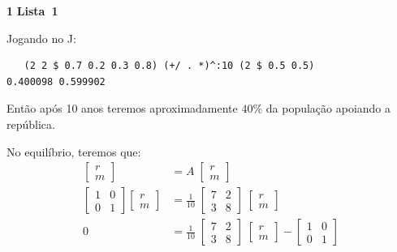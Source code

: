 \documentclass{article}
\newcounter{exe-list}
\newenvironment{exe-list}
    {\begin{list}{(\alph{exe-list})}{\usecounter{exe-list}}}
    {\end{list}}
\newenvironment{exe}[2][Sala]
    {\bigskip\noindent\par\ifthenelse{\equal{#1}{}}%
        {\textbf{\LARGE #2}}%
        {\textbf{\LARGE #1~#2}}%
    \medskip\noindent\par}
    {\bigskip}
\begin{document}
\begin{exe}[Lista]{1}
\begin{exe-list}
            Jogando no J:
            \begin{verbatim}
   (2 2 $ 0.7 0.2 0.3 0.8) (+/ . *)^:10 (2 $ 0.5 0.5)
0.400098 0.599902
            \end{verbatim}

            Então após 10 anos teremos aproximadamente
            \(40\%\) da população apoiando a república.
        \item
            No equilíbrio, teremos que:
            \begin{align*}
                \begin{bmatrix}
                        r \\ m
                    \end{bmatrix} &= A \; \begin{bmatrix}
                        r \\ m
                    \end{bmatrix} \\
                \begin{bmatrix}
                        1 & 0 \\
                        0 & 1
                    \end{bmatrix} \begin{bmatrix}
                        r \\ m
                    \end{bmatrix} &= \frac{1}{10} \; \begin{bmatrix}
                        7 & 2 \\
                        3 & 8
                    \end{bmatrix} \; \begin{bmatrix}
                        r \\ m
                    \end{bmatrix} \\
                0 &= \frac{1}{10} \; \begin{bmatrix}
                        7 & 2 \\
                        3 & 8
                    \end{bmatrix} \; \begin{bmatrix}
                        r \\ m
                    \end{bmatrix} - \begin{bmatrix}
                        1 & 0 \\
                        0 & 1

\end{bmatrix}
\end{align*}
\end{exe-list}
\end{exe}
\end{document}
